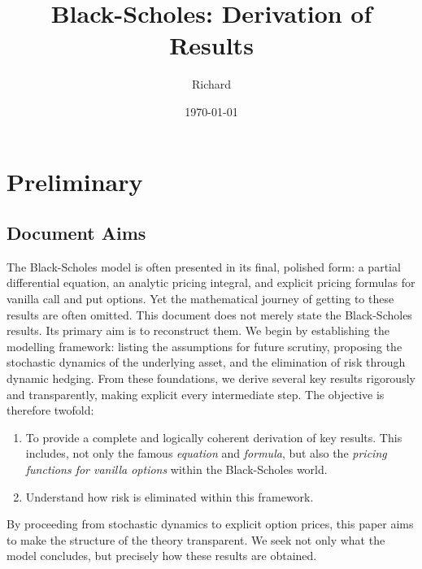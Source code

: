 \documentclass[12pt]{article}
\title{Black-Scholes: Derivation of Results}
\author{Richard}
\date{\today}
\theoremstyle{definition}
\theoremstyle{remark}
\begin{document}
\maketitle
\tableofcontents





\section{Preliminary}


\subsection{Document Aims}
The Black-Scholes model is often presented in its final, polished form: a partial differential equation, an analytic pricing integral, and explicit pricing formulas for vanilla call and put options. Yet the mathematical journey of getting to these results are often omitted. This document does not merely state the Black-Scholes results. Its primary aim is to reconstruct them. We begin by establishing the modelling framework: listing the assumptions for future scrutiny, proposing the stochastic dynamics of the underlying asset, and the elimination of risk through dynamic hedging. From these foundations, we derive several key results rigorously and transparently, making explicit every intermediate step. The objective is therefore twofold:
\begin{enumerate}
	\item To provide a complete and logically coherent derivation of key results. This includes, not only the famous {\emph{equation}} and {\emph{formula}}, but also the {\emph{pricing functions for vanilla options}} within the Black-Scholes world.
	\item Understand how risk is eliminated within this framework.
\end{enumerate}
By proceeding from stochastic dynamics to explicit option prices, this paper aims to make the structure of the theory transparent. We seek not only what the model concludes, but precisely how these results are obtained.
\end{document}
